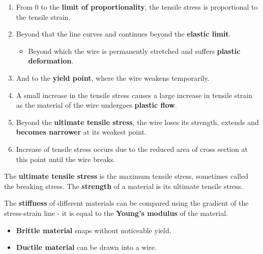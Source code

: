 \begin{enumerate}
    \item From 0 to the \textbf{limit of proportionality}, the tensile stress is proportional to the tensile strain.
    \item Beyond that the line curves and continues beyond the \textbf{elastic limit}.
        \begin{itemize}
            \item Beyond which the wire is permanently stretched and suffers \textbf{plastic deformation}.
        \end{itemize}
    \item And to the \textbf{yield point}, where the wire weakens temporarily.
    \item A small increase in the tensile stress causes a large increase in tensile strain as the material of the wire undergoes \textbf{plastic flow}.
    \item Beyond the \textbf{ultimate tensile stress}, the wire loses its strength, extends and \textbf{becomes narrower} at its weakest point.
    \item Increase of tensile stress occurs due to the reduced area of cross section at this point until the wire breaks.
\end{enumerate}

The \textbf{ultimate tensile stress} is the maximum tensile stress, sometimes called the breaking stress. The \textbf{strength} of a material is its ultimate tensile stress.

The \textbf{stiffness} of different materials can be compared using the gradient of the stress-strain line - it is equal to the \textbf{Young's modulus} of the material.
\begin{itemize}
    \item \textbf{Brittle material} snaps without noticeable yield.
    \item \textbf{Ductile material} can be drawn into a wire.
\end{itemize}
